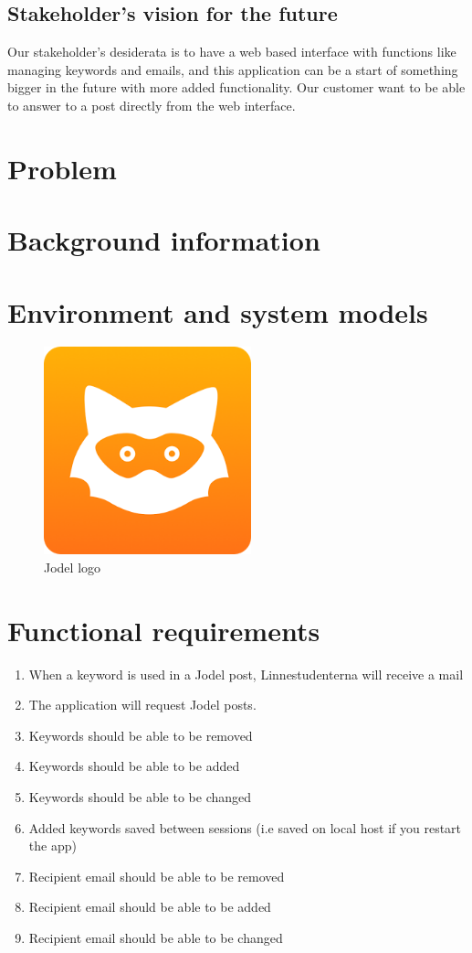 \documentclass[a4paper,12pt]{article}
\begin{document}
\subsection{Stakeholder's vision for the future}
Our stakeholder's desiderata is to have a web based interface with functions like managing keywords and emails, and this application can be a start of something bigger in the future with more added functionality.
Our customer want to be able to answer to a post directly from the web interface.

\section{Problem}

\section{Background information}

\section{Environment and system models}

\begin{figure}[!h]
	\centering
	\includegraphics[height=6cm]{img/jodel.png}
	\caption{Jodel logo}
	\label{Cisco routing}
\end{figure}
\section{Functional requirements}
\begin{enumerate}
	\item When a keyword is used in a Jodel post, Linnestudenterna will receive a mail
	\item The application will request Jodel posts.
	\item Keywords should be able to be removed
	\item Keywords should be able to be added
	\item Keywords should be able to be changed
	\item Added keywords saved between sessions (i.e saved on local host if you restart the app)
	\item Recipient email should be able to be removed
	\item Recipient email should be able to be added
	\item Recipient email should be able to be changed
\end{enumerate}
\end{document}
